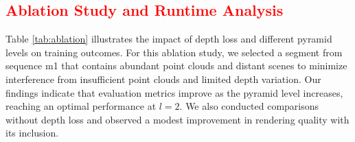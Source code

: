 \documentclass[lettersize,journal]{IEEEtran}
\begin{document}
\begin{table}
\centering
\renewcommand{\arraystretch}{1.2} %
\setlength{\tabcolsep}{4pt} %
\caption{\textcolor{red}{The impact of keyframe selection and keyframe delay on performance.}}
\label{tab:keyframe_comparison}
\end{table}



\subsection{\textcolor{red}{Ablation Study and Runtime Analysis}}

Table \ref{tab:ablation} illustrates the impact of depth loss and different pyramid levels on training outcomes. For this ablation study, we selected a segment from sequence m1 that contains abundant point clouds and distant scenes to minimize interference from insufficient point clouds and limited depth variation. Our findings indicate that evaluation metrics improve as the pyramid level increases, reaching an optimal performance at $l=2$. We also conducted comparisons without depth loss and observed a modest improvement in rendering quality with its inclusion.
\end{document}
